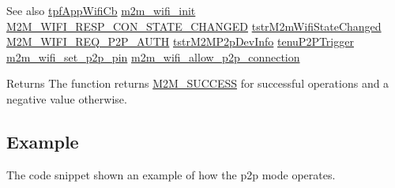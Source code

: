 \begin{DoxySeeAlso}{See also}
\hyperlink{group__WlanEnums_gac5302f32839285fe8375c159087aa8a1}{tpf\+App\+Wifi\+Cb} \hyperlink{group__WifiInitFn_ga73c734812e844d96d860c4e93e9daf35}{m2m\+\_\+wifi\+\_\+init} \hyperlink{group__WlanEnums_gga064de09dec1d5e88ed8d075fa40f57deabb42b3025c56c51d915a1fa4abd2dbd0}{M2\+M\+\_\+\+W\+I\+F\+I\+\_\+\+R\+E\+S\+P\+\_\+\+C\+O\+N\+\_\+\+S\+T\+A\+T\+E\+\_\+\+C\+H\+A\+N\+G\+ED} \hyperlink{structtstrM2mWifiStateChanged}{tstr\+M2m\+Wifi\+State\+Changed} \hyperlink{group__WlanEnums_gga064de09dec1d5e88ed8d075fa40f57dea4e202c60cd4154e5c0c247e0fa8c990f}{M2\+M\+\_\+\+W\+I\+F\+I\+\_\+\+R\+E\+Q\+\_\+\+P2\+P\+\_\+\+A\+U\+TH} \hyperlink{structtstrM2MP2pDevInfo}{tstr\+M2\+M\+P2p\+Dev\+Info} \hyperlink{group__WlanEnums_ga0b97cca65d26d6163cabcb708e5759df}{tenu\+P2\+P\+Trigger} \hyperlink{group__WlanEnums_gac93d56dc53ba0a5a02b669c800b7ae62}{m2m\+\_\+wifi\+\_\+set\+\_\+p2p\+\_\+pin} \hyperlink{m2m__wifi_8h_a25d63ac165f19310f6ed73d115ad9155}{m2m\+\_\+wifi\+\_\+allow\+\_\+p2p\+\_\+connection}
\end{DoxySeeAlso}
\begin{DoxyReturn}{Returns}
The function returns \hyperlink{nm__common_8h_a9ef27ba27aafdd1aa3a79d3ba2c36b8f}{M2\+M\+\_\+\+S\+U\+C\+C\+E\+SS} for successful operations and a negative value otherwise. 
\end{DoxyReturn}
\hypertarget{group__WifiEnableMonitorModeFn_Example}{}\subsection{Example}\label{group__WifiEnableMonitorModeFn_Example}
The code snippet shown an example of how the p2p mode operates. 
